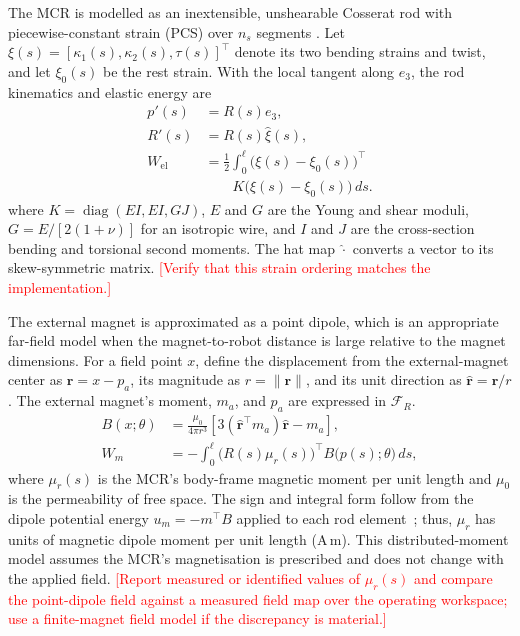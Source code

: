 \documentclass[journal]{IEEEtran}
\newcommand{\TBD}[1]{\textcolor{red}{[#1]}}
\begin{document}
The MCR is modelled as an inextensible, unshearable Cosserat rod with
piecewise-constant strain (PCS) over $n_s$ segments
\cite{renda2018discrete,edelmann2017magnetic}. Let
$\xi(s)=[\kappa_1(s),\kappa_2(s),\tau(s)]^\top$ denote its two
bending strains and twist, and let $\xi_0(s)$ be the rest strain. With
the local tangent along $e_3$, the rod kinematics and elastic energy are
\begin{equation}
\begin{aligned}
p'(s) &= R(s)e_3,\\
R'(s) &= R(s)\widehat{\xi}(s),\\
W_{\mathrm{el}} &= \frac{1}{2}\int_0^\ell
\bigl(\xi(s)-\xi_0(s)\bigr)^\top\\
&\qquad K\bigl(\xi(s)-\xi_0(s)\bigr)\,ds .
\end{aligned}
\label{eq:rod}
\end{equation}
where $K=\operatorname{diag}(EI,EI,GJ)$, $E$ and $G$ are the Young
and shear moduli, $G=E/[2(1+\nu)]$ for an isotropic wire, and $I$ and
$J$ are the cross-section bending and torsional second moments.
The hat map $\widehat{\cdot}$ converts a vector to its skew-symmetric
matrix. \TBD{Verify that this strain ordering matches the implementation.}

The external magnet is approximated as a point dipole, which is
an appropriate far-field model when the magnet-to-robot distance is
large relative to the magnet dimensions. For a field point $x$, define the displacement from
the external-magnet center as
$\mathbf r=x-p_a$, its magnitude as $r=\|\mathbf r\|$, and its unit
direction as $\widehat{\mathbf r}=\mathbf r/r$. The external magnet's
moment, $m_a$, and $p_a$ are expressed in $\mathcal F_R$.
\begin{align}
B(x;\theta)
&=\frac{\mu_0}{4\pi r^3}
\left[3(\widehat{\mathbf r}^{\top}m_a)\widehat{\mathbf r}-m_a\right],
\label{eq:dipole}\\
W_m
&=-\int_0^\ell
\big(R(s)\mu_r(s)\big)^\top
B\big(p(s);\theta\big)\,ds,
\label{eq:wm}
\end{align}
where $\mu_r(s)$ is the MCR's body-frame magnetic moment per unit
length and $\mu_0$ is the permeability of free space. The sign and
integral form follow from the dipole potential energy
$u_m=-m^\top B$ applied to each rod element~\cite{kim2022magnetic};
thus, $\mu_r$ has units of magnetic dipole moment per unit length
($\mathrm{A\,m}$). This distributed-moment model assumes the MCR's magnetisation
is prescribed and does not change with the applied field.
\TBD{Report measured or identified values of $\mu_r(s)$ and compare the
point-dipole field against a measured field map over the operating
workspace; use a finite-magnet field model if the discrepancy is material.}
\end{document}
